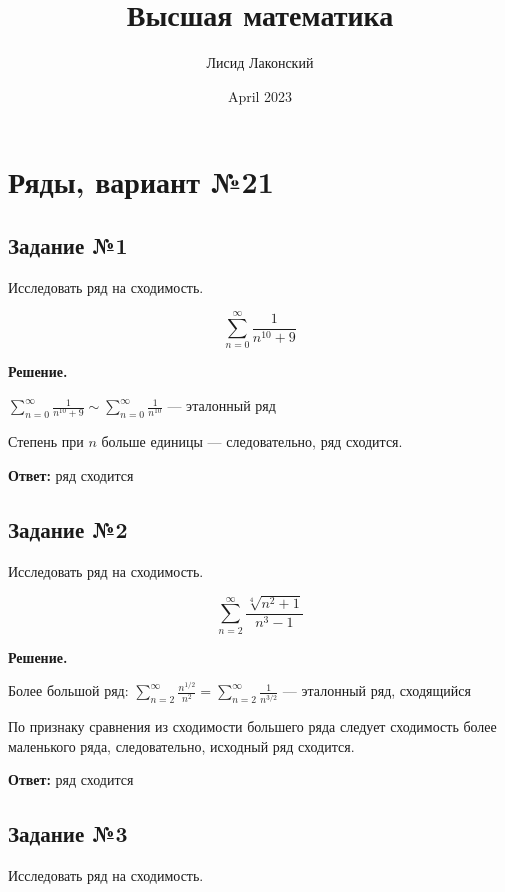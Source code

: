 \documentclass{article}
\title{Высшая математика}
\author{Лисид Лаконский}
\date{April 2023}
\begin{document}
\raggedright

\maketitle

\tableofcontents
\pagebreak

\section{Ряды, вариант №21}

\subsection{Задание №1}

Исследовать ряд на сходимость.

$$
\sum\limits_{n = 0}^{\infty} \frac{1}{n^{10} + 9}
$$

\textbf{Решение.}

$\sum\limits_{n = 0}^{\infty} \frac{1}{n^{10} + 9} \sim \sum\limits_{n = 0}^{\infty} \frac{1}{n^{10}}$ — эталонный ряд

Степень при $n$ больше единицы — следовательно, ряд сходится.

\hfill

\textbf{Ответ:} ряд сходится

\subsection{Задание №2}

Исследовать ряд на сходимость.

$$
\sum\limits_{n = 2}^{\infty} \frac{\sqrt[4]{n^2 + 1}}{n^3 - 1}
$$

\textbf{Решение.}

Более большой ряд: $\sum\limits_{n = 2}^{\infty} \frac{n^{1/2}}{n^2} = \sum\limits_{n = 2}^{\infty} \frac{1}{n^{3/2}}$ — эталонный ряд, сходящийся

По признаку сравнения из сходимости большего ряда следует сходимость более маленького ряда, следовательно, исходный ряд сходится.

\hfill

\textbf{Ответ:} ряд сходится

\subsection{Задание №3}

Исследовать ряд на сходимость.
\end{document}
